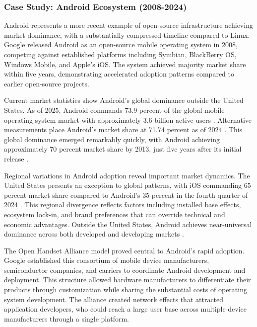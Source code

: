 \subsubsection{Case Study: Android Ecosystem (2008-2024)}

Android represents a more recent example of open-source infrastructure achieving market dominance, with a substantially compressed timeline compared to Linux. Google released Android as an open-source mobile operating system in 2008, competing against established platforms including Symbian, BlackBerry OS, Windows Mobile, and Apple's iOS. The system achieved majority market share within five years, demonstrating accelerated adoption patterns compared to earlier open-source projects.

Current market statistics show Android's global dominance outside the United States. As of 2025, Android commands 73.9 percent of the global mobile operating system market with approximately 3.6 billion active users \cite{android_demandsage2025}. Alternative measurements place Android's market share at 71.74 percent as of 2024 \cite{android_enterpriseapps2024}. This global dominance emerged remarkably quickly, with Android achieving approximately 70 percent market share by 2013, just five years after its initial release \cite{android_demandsage2025}.

Regional variations in Android adoption reveal important market dynamics. The United States presents an exception to global patterns, with iOS commanding 65 percent market share compared to Android's 35 percent in the fourth quarter of 2024 \cite{android_ioscomparison2024}. This regional divergence reflects factors including installed base effects, ecosystem lock-in, and brand preferences that can override technical and economic advantages. Outside the United States, Android achieves near-universal dominance across both developed and developing markets \cite{android_ioscomparison2024}.

The Open Handset Alliance model proved central to Android's rapid adoption. Google established this consortium of mobile device manufacturers, semiconductor companies, and carriers to coordinate Android development and deployment. This structure allowed hardware manufacturers to differentiate their products through customization while sharing the substantial costs of operating system development. The alliance created network effects that attracted application developers, who could reach a large user base across multiple device manufacturers through a single platform.

